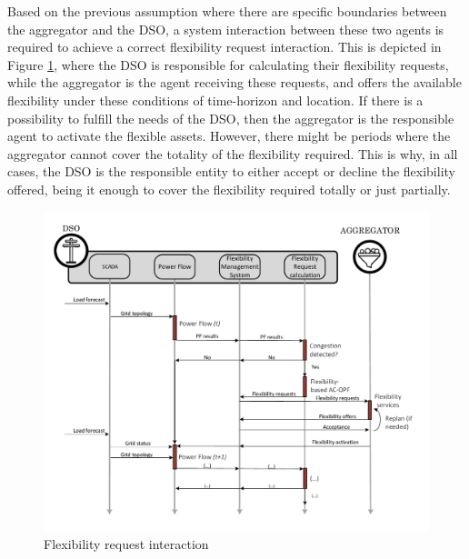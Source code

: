 Based on the previous assumption where there are specific boundaries between the aggregator and the DSO, a system interaction between these two agents is required to achieve a correct flexibility request interaction. This is depicted in Figure \ref{fig:AGG_DSO_FR}, where the DSO is responsible for calculating their flexibility requests, while the aggregator is the agent receiving these requests, and offers the available flexibility under these conditions of time-horizon and location. If there is a possibility to fulfill the needs of the DSO, then the aggregator is the responsible agent to activate the flexible assets. However, there might be periods where the aggregator cannot cover the totality of the flexibility required. This is why, in all cases, the DSO is the responsible entity to either accept or decline the flexibility offered, being it enough to cover the flexibility required totally or just partially.  

\begin{figure}[h]
	\centering
	\includegraphics[width=1\columnwidth ]{ChapterOPF_DSO/Figures/OPF_interaction_ACOPF.pdf}
		\caption{Flexibility request interaction}
	\label{fig:AGG_DSO_FR}  
\end{figure}

\newpage
